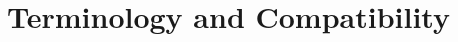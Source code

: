 \clearpage
\section{Terminology and Compatibility}\label{page:terminology-and-compatibility}\label{section:terminology}

